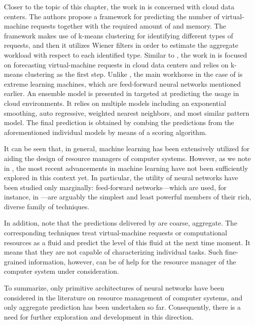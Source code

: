 Closer to the topic of this chapter, the work in \cite{dabbagh2015} is concerned
with cloud data centers. The authors propose a framework for predicting the
number of virtual-machine requests together with the required amount of 
and memory. The framework makes use of k-means clustering \cite{hastie2013} for
identifying different types of requests, and then it utilizes Wiener filters in
order to estimate the aggregate workload with respect to each identified type.
Similar to \cite{dabbagh2015}, the work in \cite{ismaeel2015} is focused on
forecasting virtual-machine requests in cloud data centers and relies on k-means
clustering as the first step. Unlike \cite{dabbagh2015}, the main workhorse in
the case of \cite{ismaeel2015} is extreme learning machines, which are
feed-forward neural networks mentioned earlier. An ensemble model
\cite{hastie2013} is presented in \cite{cao2014} targeted at predicting the
 usage in cloud environments. It relies on multiple models including an
exponential smoothing, auto regressive, weighted nearest neighbors, and most
similar pattern model. The final prediction is obtained by combing the
predictions from the aforementioned individual models by means of a scoring
algorithm.

It can be seen that, in general, machine learning has been extensively utilized
for aiding the design of resource managers of computer systems. However, as we
note in , the most recent advancements in machine
learning have not been sufficiently explored in this context yet. In particular,
the utility of neural networks have been studied only marginally: feed-forward
networks---which are used, for instance, in \cite{kumar2010, ismaeel2015}---are
arguably the simplest and least powerful members of their rich, diverse family
of techniques.

In addition, note that the predictions delivered by \cite{cao2014, dabbagh2015,
ismaeel2015} are coarse, aggregate. The corresponding techniques treat
virtual-machine requests or computational resources as a fluid and predict the
level of this fluid at the next time moment. It means that they are not capable
of characterizing individual tasks. Such fine-grained information, however, can
be of help for the resource manager of the computer system under consideration.

To summarize, only primitive architectures of neural networks have been
considered in the literature on resource management of computer systems, and
only aggregate prediction has been undertaken so far. Consequently, there is a
need for further exploration and development in this direction.

